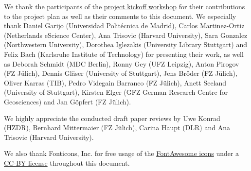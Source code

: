 \documentclass[11pt,a4paper]{scrartcl}
\begin{document}
We thank the participants of the \href{https://events.hifis.net/event/205/}{project kickoff workshop} for their contributions to the project plan as well as their comments to this document. We especially thank Daniel Garijo (Universidad Politécnica de Madrid), Carlos Martinez-Ortiz (Netherlands eScience Center), Ana Trisovic (Harvard University), Sara Gonzalez (Northwestern University), Dorothea Iglezakis (University Library Stuttgart) and Felix Bach (Karlsruhe Institute of Technology) for presenting their work, as well as Deborah Schmidt (MDC Berlin), Ronny Gey (UFZ Leipzig), Anton Pirogov (FZ Jülich), Dennis Gläser (University of Stuttgart), Jens Bröder (FZ Jülich), Oliver Karras (TIB), Pedro Videgain Barranco (FZ Jülich), Anett Seeland (University of Stuttgart), Kirsten Elger (GFZ German Research Centre for Geosciences) and Jan Göpfert (FZ Jülich).

We highly appreciate the conducted draft paper reviews by Uwe Konrad (HZDR), Bernhard Mittermaier (FZ Jülich), Carina Haupt (DLR) and Ana Trisovic (Harvard University).

We also thank Fonticons, Inc. for free usage of the \href{https://fontawesome.com}{FontAwesome icons} under a \href{https://fontawesome.com/license/free}{CC-BY license} throughout this document.


\printglossaries

\printbibliography[heading=bibintoc]
\end{document}
